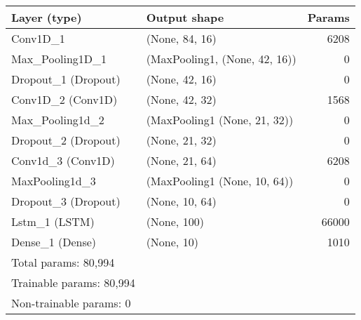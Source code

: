 \begin{center}

  \begin{tabularx}{\textwidth}{l X r}

    \textbf{Layer (type)} & \textbf{Output shape} & \textbf{Params} \\
    \hline
    \hline
    Conv1D\_1 & (None, 84, 16) & 6208 \\
    \hline
    Max\_Pooling1D\_1 & (MaxPooling1, (None, 42, 16)) & 0 \\
    \hline
    Dropout\_1 (Dropout) & (None, 42, 16) & 0 \\
    \hline
    Conv1D\_2 (Conv1D) & (None, 42, 32) & 1568 \\
    \hline
    Max\_Pooling1d\_2 & (MaxPooling1 (None, 21, 32)) & 0 \\
    \hline
    Dropout\_2 (Dropout) & (None, 21, 32) & 0 \\
    \hline
    Conv1d\_3 (Conv1D) & (None, 21, 64) & 6208 \\
    \hline
    MaxPooling1d\_3 & (MaxPooling1 (None, 10, 64)) & 0 \\
    \hline
    Dropout\_3 (Dropout) & (None, 10, 64) & 0 \\
    \hline
    Lstm\_1 (LSTM) & (None, 100) & 66000 \\
    \hline
    Dense\_1 (Dense) & (None, 10) & 1010 \\
    \hline
    \hline
    Total params: 80,994 & & \\
    Trainable params: 80,994 & & \\
    Non-trainable params: 0 & & \\
    \hline
    \hline

  \end{tabularx}

  \label{tab:conv1d}

\end{center}

